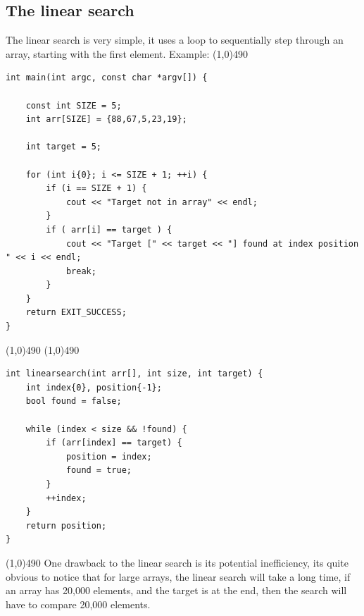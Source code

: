 \documentclass{report}
\begin{document}
    \subsection{The linear search}
    \bigbreak \noindent 
    The linear search is very simple, it uses a loop to sequentially step through an array, starting with the first element.
    \bigbreak \noindent 
    Example:
    \bigbreak \noindent 
    \line(1,0){490}
    \begin{verbatim}
int main(int argc, const char *argv[]) {

    const int SIZE = 5;
    int arr[SIZE] = {88,67,5,23,19};

    int target = 5;

    for (int i{0}; i <= SIZE + 1; ++i) {
        if (i == SIZE + 1) {
            cout << "Target not in array" << endl;
        }
        if ( arr[i] == target ) {
            cout << "Target [" << target << "] found at index position " << i << endl;
            break;
        }
    }
    return EXIT_SUCCESS;
}
    \end{verbatim}
    \line(1,0){490}
    \bigbreak \noindent 
    \line(1,0){490}
    \begin{verbatim}
int linearsearch(int arr[], int size, int target) {
    int index{0}, position{-1};
    bool found = false;

    while (index < size && !found) {
        if (arr[index] == target) {
            position = index;
            found = true;
        }
        ++index;
    }
    return position;
}
    \end{verbatim}
    \line(1,0){490}
    \bigbreak \noindent 
    \pagebreak \bigbreak \noindent 
    One drawback to the linear search is its potential inefficiency, its quite obvious to notice that for large arrays, the linear search will take a long time, if an array has 20,000 elements, and the target is at the end, then the search will have to compare 20,000 elements.
    \bigbreak \noindent 
\end{document}
